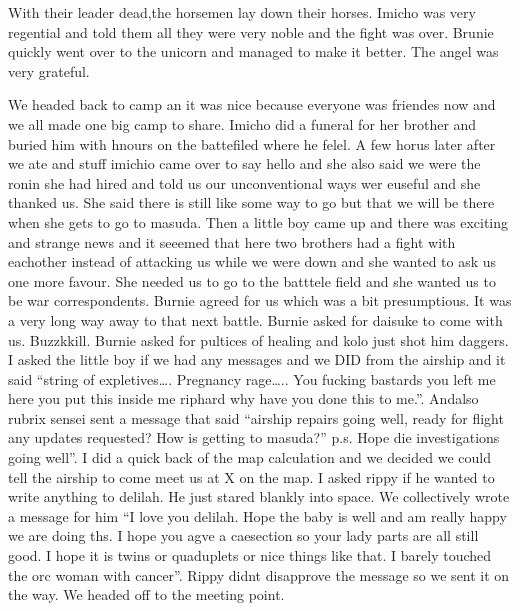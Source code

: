 \begin{multicols}{2}
With their leader dead,the horsemen lay down their horses. Imicho was very regential and told them all they were very noble and the fight was over. Brunie quickly went over to the unicorn and managed to make it better. The angel was very grateful.\medskip

We headed back to camp an it was nice because everyone was friendes now and we all made one big camp to share. Imicho did a funeral for her brother and buried him with hnours on the battefiled where he felel. A few horus later after we ate and stuff imichio came over to say hello and she also said we were the ronin she had hired and told us our unconventional ways wer euseful and she thanked us. She said there is still like some way to go but that we will be there when she gets to go to masuda. Then a little boy came up and there was exciting and strange news and it seeemed that here two brothers had a fight with eachother instead of attacking us while we were down and she wanted to ask us one more favour. She needed us to go to the batttele field and she wanted us to be war correspondents. Burnie agreed for us which was a bit presumptious. It was a very long way away to that next battle. Burnie asked for daisuke to come with us. Buzzkkill. Burnie asked for pultices of healing and kolo just shot him daggers. I asked the little boy if we had any messages and we DID from the airship and it said “string of expletives…. Pregnancy rage….. You fucking bastards you left me here you put this inside me riphard why have you done this to me.”. Andalso rubrix sensei sent a message that said “airship repairs going well, ready for flight any updates requested? How is getting to masuda?” p.s. Hope die investigations going well”. I did a quick back of the map calculation and we decided we could tell the airship to come meet us at X on the map. I asked rippy if he wanted to write anything to delilah. He just stared blankly into space. We collectively wrote a message for him “I love you delilah. Hope the baby is well and am really happy we are doing ths. I hope you agve a caesection so your lady parts are all still good. I hope it is twins or quaduplets or nice things like that. I barely touched the orc woman with cancer”. Rippy didnt disapprove the message so we sent it on the way. We headed off to the meeting point.\medskip


\end{multicols}
